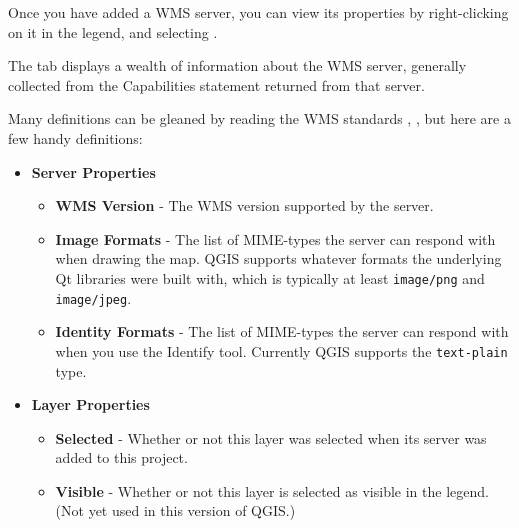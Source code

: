 Once you have added a WMS server, you can view its properties
by right-clicking on it in the legend, and selecting
.


\label{sec:ogc-wms-properties-metadata}

The  tab displays a wealth of information about the WMS server,
generally collected from the Capabilities statement returned from
that server.

Many definitions can be gleaned by reading the WMS
standards \cite{OGCWMS010101web}, \cite{OGCWMS010300web}, but
here are a few handy definitions:

\begin{itemize}
\item \textbf{Server Properties}

\begin{itemize}
\item \textbf{WMS Version}      - The WMS version supported by the server.

\item \textbf{Image Formats}    - The list of MIME-types the server can respond with when
                                  drawing the map.  QGIS supports whatever formats
                                  the underlying Qt libraries were built with, which
                                  is typically at least \texttt{image/png} 
                                  and \texttt{image/jpeg}.

\item \textbf{Identity Formats} - The list of MIME-types the server can respond with when
                                  you use the Identify tool.  Currently QGIS supports
                                  the \texttt{text-plain} type.

\end{itemize}

\item \textbf{Layer Properties}

\begin{itemize}
\item \textbf{Selected}         - Whether or not this layer was selected when its                                                                        server was added to this project.

\item \textbf{Visible}          - Whether or not this layer is selected as visible
                                  in the legend.  (Not yet used in this version of QGIS.)


\end{itemize}
\end{itemize}

